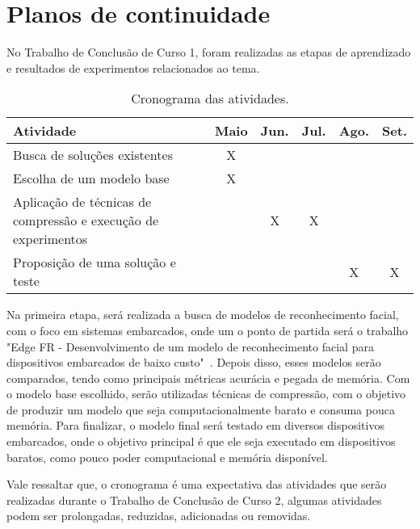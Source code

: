 \chapter{Planos de continuidade}
No Trabalho de Conclusão de Curso 1, foram realizadas as etapas de aprendizado e resultados de experimentos
relacionados ao tema.

\begin{center}
\begin{table}[htb]
\centering
\ABNTEXfontereduzida
\caption[Cronograma das atividades]{Cronograma das atividades.}
\label{tabela_plano}
\begin{tabular}{ |l|c|c|c|c|c| }
	\hline
	Atividade & Maio & Jun. & Jul. & Ago. & Set. \\
	\hline
	Busca de soluções existentes & X & & & & \\
	\hline
	Escolha de um modelo base & X & &  & & \\
	\hline
	Aplicação de técnicas de compressão e execução de experimentos & & X & X & & \\
	\hline
	Proposição de uma solução e teste & & & & X & X \\
	\hline
\end{tabular}
\end{table}
\end{center}

Na primeira etapa, será realizada a busca de modelos de reconhecimento facial, com o foco em sistemas embarcados,
onde um o ponto de partida será o trabalho "Edge FR - Desenvolvimento de um modelo de reconhecimento facial para dispositivos
embarcados de baixo custo"\  \cite{leandro}.
Depois disso, esses modelos serão comparados, tendo como principais métricas acurácia e pegada de memória.
Com o modelo base escolhido, serão utilizadas técnicas de compressão, com o objetivo de produzir um modelo que seja
computacionalmente barato e consuma pouca memória.
Para finalizar, o modelo final será testado em diversos dispositivos embarcados, onde o objetivo principal é que ele
seja executado em dispositivos baratos, como pouco poder computacional e memória disponível.

Vale ressaltar que, o cronograma é uma expectativa das atividades que serão realizadas durante o Trabalho de Conclusão
de Curso 2, algumas atividades podem ser prolongadas, reduzidas, adicionadas ou removidas.
